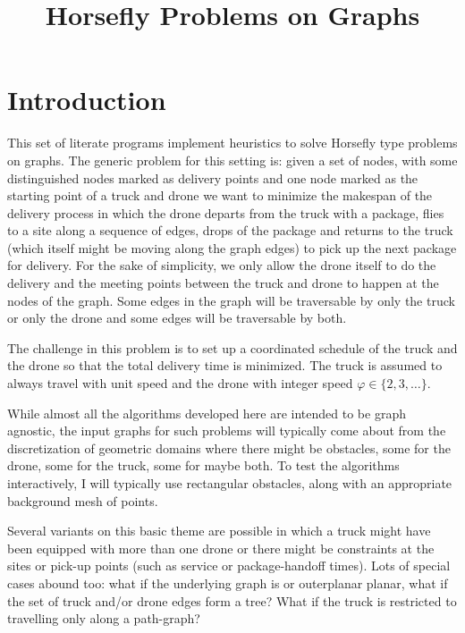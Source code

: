 \documentclass[11.5pt]{report}
\title{Horsefly Problems on Graphs}
\begin{document}
\maketitle
\tableofcontents

\chapter{Introduction}

This set of literate programs implement heuristics to solve Horsefly type problems on graphs. The generic problem for this setting 
is: given a set of nodes, with some distinguished nodes marked as delivery points and one node marked as the starting point 
of a truck and drone we want to minimize the makespan of the delivery process in which the drone departs from the truck 
with a package, flies to a site along a sequence of edges, drops of the package and returns to the truck (which itself might be moving 
along the graph edges) to pick up the next package for delivery. For the sake of simplicity, we only allow the drone itself to do the delivery 
and the meeting points between the truck and drone to happen at the nodes of the graph. Some edges in the graph will be traversable by 
only the truck or only the drone and some edges will be traversable by both. 

The challenge in this problem is to set up a coordinated schedule of the truck and the drone so that the total delivery time is minimized. 
The truck is assumed to always travel with unit speed and the drone with integer speed $\varphi \in \{2,3,\ldots\}$. 

While almost all the algorithms developed here are intended to be graph agnostic, the input graphs for such problems will typically come 
about from the discretization of geometric domains where there might be obstacles, some for the drone, some for the truck, some for maybe both. 
To test the algorithms interactively, I will typically use rectangular obstacles, along with an appropriate background mesh of points.



Several variants on this basic theme are possible in which a truck might have been equipped with more than one drone or there might be 
constraints at the sites or pick-up points (such as service or package-handoff times). Lots of special cases abound too: what if the underlying 
graph is or outerplanar planar, what if the set of truck and/or drone edges form a tree? What if the truck is restricted to travelling only 
along a path-graph? 
\end{document}
